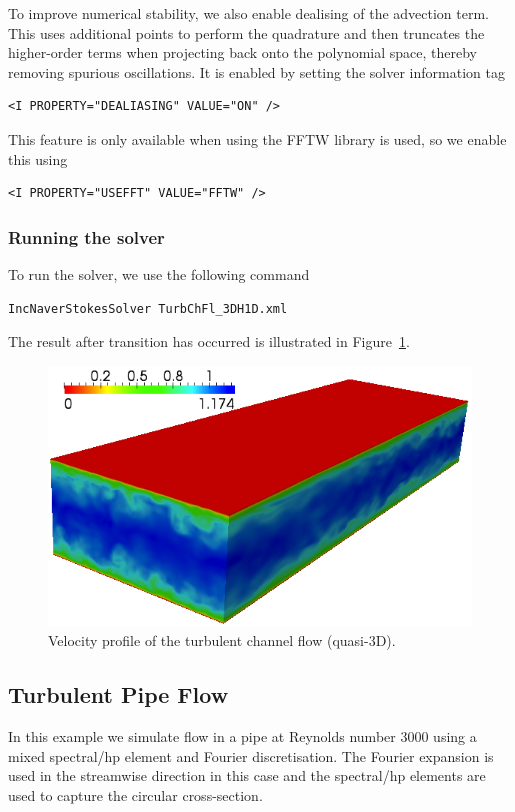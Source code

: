 To improve numerical stability, we also enable dealising of the advection term.
This uses additional points to perform the quadrature and then truncates the
higher-order terms when projecting back onto the polynomial space, thereby
removing spurious oscillations. It is enabled by setting the solver information
tag
\begin{lstlisting}[style=XMLStyle]
<I PROPERTY="DEALIASING" VALUE="ON" />
\end{lstlisting}
This feature is only available when using the FFTW library is used, so we enable
this using
\begin{lstlisting}[style=XMLStyle]
<I PROPERTY="USEFFT" VALUE="FFTW" />
\end{lstlisting}


\subsubsection{Running the solver}
To run the solver, we use the following command
\begin{lstlisting}[style=BashInputStyle]
IncNaverStokesSolver TurbChFl_3DH1D.xml
\end{lstlisting}
The result after transition has occurred is illustrated in
Figure~\ref{f:incns:turbchanflow}.

\begin{figure}
\begin{center}
\includegraphics[width=12cm]{img/ChanCont.png}
\caption{Velocity profile of the turbulent channel flow (quasi-3D).}
\label{f:incns:turbchanflow}
\end{center}
\end{figure}


\subsection{Turbulent Pipe Flow}
In this example we simulate flow in a pipe at Reynolds number 3000 using a mixed
spectral/hp element and Fourier discretisation. The Fourier expansion is used in
the streamwise direction in this case and the spectral/hp elements are used to
capture the circular cross-section.


